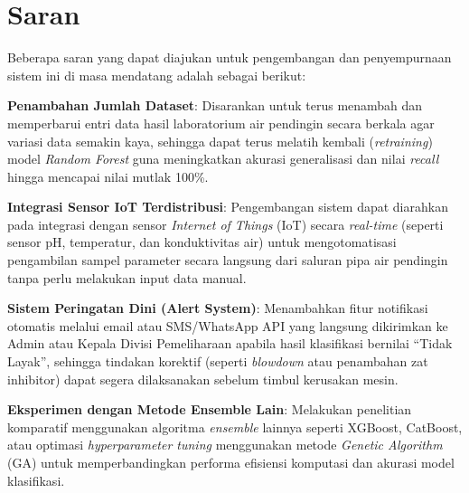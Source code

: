 \section{Saran}
Beberapa saran yang dapat diajukan untuk pengembangan dan penyempurnaan sistem ini di masa mendatang adalah sebagai berikut:
\begin{packed_item}
    \item \textbf{Penambahan Jumlah Dataset}: Disarankan untuk terus menambah dan memperbarui entri data hasil laboratorium air pendingin secara berkala agar variasi data semakin kaya, sehingga dapat terus melatih kembali (\textit{retraining}) model \textit{Random Forest} guna meningkatkan akurasi generalisasi dan nilai \textit{recall} hingga mencapai nilai mutlak 100\%.
    \item \textbf{Integrasi Sensor IoT Terdistribusi}: Pengembangan sistem dapat diarahkan pada integrasi dengan sensor \textit{Internet of Things} (IoT) secara \textit{real-time} (seperti sensor pH, temperatur, dan konduktivitas air) untuk mengotomatisasi pengambilan sampel parameter secara langsung dari saluran pipa air pendingin tanpa perlu melakukan input data manual.
    \item \textbf{Sistem Peringatan Dini (Alert System)}: Menambahkan fitur notifikasi otomatis melalui email atau SMS/WhatsApp API yang langsung dikirimkan ke Admin atau Kepala Divisi Pemeliharaan apabila hasil klasifikasi bernilai ``Tidak Layak'', sehingga tindakan korektif (seperti \textit{blowdown} atau penambahan zat inhibitor) dapat segera dilaksanakan sebelum timbul kerusakan mesin.
    \item \textbf{Eksperimen dengan Metode Ensemble Lain}: Melakukan penelitian komparatif menggunakan algoritma \textit{ensemble} lainnya seperti XGBoost, CatBoost, atau optimasi \textit{hyperparameter tuning} menggunakan metode \textit{Genetic Algorithm} (GA) untuk memperbandingkan performa efisiensi komputasi dan akurasi model klasifikasi.
\end{packed_item}